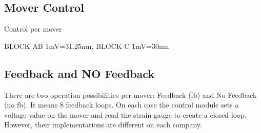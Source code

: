 \subsection{Mover Control}
Control per mover\par
\begin{center}
\end{center}
{\tiny BLOCK AB 1mV=31.25nm, BLOCK C 1mV=30nm}\par

\subsection{Feedback and NO Feedback}
There are two operation possibilities per mover: Feedback (fb) and No Feedback (no fb). It means 8 feedback loops. On each case the control module sets a voltage value on the mover and read the strain gauge to create a closed loop. However, their implementations are different on each company.

